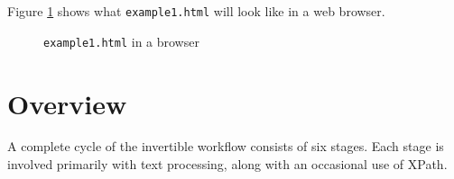 \documentclass[a4paper, 12pt]{report}
\begin{document}
Figure \ref{fig:2.1} shows what \texttt{example1.html} will look like in a web browser.
\begin{figure}[h!]
\caption{\texttt{example1.html} in a browser}
\label{fig:2.1}
\end{figure}

\pagebreak
\section{Overview}
\label{sec:overview}

A complete cycle of the invertible workflow consists of six stages. Each stage is involved primarily with text processing, along with an occasional use of XPath.
\end{document}
